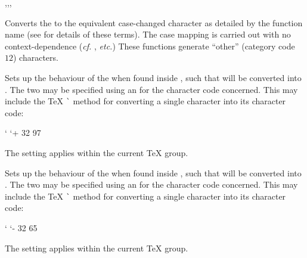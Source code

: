 \documentclass[oneside]{book}
\begin{document}
\begin{function}{\CharStrLowercase,\CharStrUppercase,\CharStrTitlecase,\CharStrFoldcase}
\begin{syntax}
 
 
 
 
\end{syntax}
Converts the  to the equivalent case-changed character
as detailed by the function name (see %
 for details of these terms). The case mapping
is carried out with no context-dependence (\emph{cf.} ,
\emph{etc.}) These functions generate \enquote{other} (category code $12$)
characters.
\end{function}

\begin{function}{\CharSetLccode}
\begin{syntax}
  
\end{syntax}
Sets up the behaviour of the  when
found inside , such that 
will be converted into . The two 
may be specified using an  for the character code
concerned. This may include the \TeX{} \verb|`|
method for converting a single character into its character code:
\begin{codehigh}
 {`\a} %
 {`\A + 32}
 {97}
\end{codehigh}
The setting applies within the current \TeX{} group.
\end{function}

\begin{function}{\CharSetUccode}
\begin{syntax}
  
\end{syntax}
Sets up the behaviour of the  when
found inside , such that 
will be converted into . The two 
may be specified using an  for the character code
concerned. This may include the \TeX{} \verb|`|
method for converting a single character into its character code:
\begin{codehigh}
 {`\A} %
 {`\a - 32}
 {65}
\end{codehigh}
The setting applies within the current \TeX{} group.
\end{function}
\end{document}
